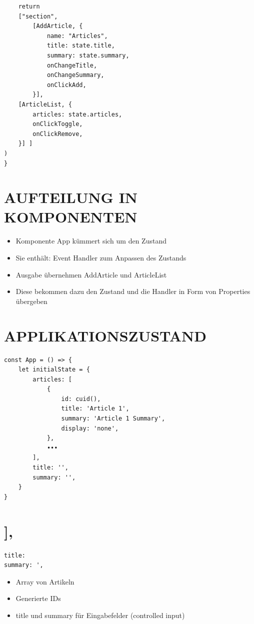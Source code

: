 \begin{verbatim}
    return
    ["section",
        [AddArticle, {
            name: "Articles",
            title: state.title,
            summary: state.summary,
            onChangeTitle,
            onChangeSummary,
            onClickAdd,
        }],
    [ArticleList, {
        articles: state.articles,
        onClickToggle,
        onClickRemove,
    }] ]
)
}
\end{verbatim}

\section*{AUFTEILUNG IN KOMPONENTEN}
\begin{itemize}
  \item Komponente App kümmert sich um den Zustand
  \item Sie enthält: Event Handler zum Anpassen des Zustands
  \item Ausgabe übernehmen AddArticle und ArticleList
  \item Diese bekommen dazu den Zustand und die Handler in Form von Properties übergeben
\end{itemize}

\section*{APPLIKATIONSZUSTAND}
\begin{verbatim}
const App = () => {
    let initialState = {
        articles: [
            {
                id: cuid(),
                title: 'Article 1',
                summary: 'Article 1 Summary',
                display: 'none',
            },
            •••
        ],
        title: '',
        summary: '',
    }
}
\end{verbatim}

\section*{],}
\begin{verbatim}
title:
summary: ',
\end{verbatim}

\begin{itemize}
  \item Array von Artikeln
  \item Generierte IDs
  \item title und summary für Eingabefelder (controlled input)
\end{itemize}

